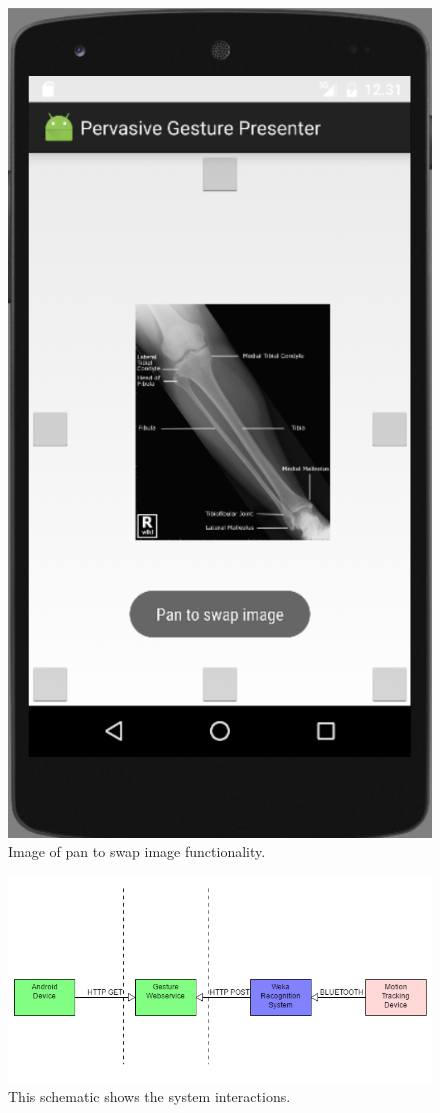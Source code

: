 \begin{figure}[!h]
\centering
\includegraphics[width=0.4\columnwidth]{img/android_zoom_pan}
\caption{ Image of pan to swap image functionality.}
\label{fig:android2}
\end{figure}

\begin{figure}[!h]
\centering
\includegraphics[width=0.9\columnwidth]{img/system_diagram}
\caption{This schematic shows the system interactions.}
\label{fig:sys}
\end{figure}